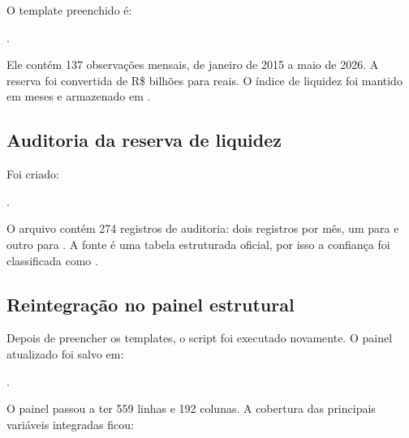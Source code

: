 \documentclass[12pt,a4paper]{article}
\begin{document}
O template preenchido é:
\begin{center}
.
\end{center}

Ele contém 137 observações mensais, de janeiro de 2015 a maio de 2026. A reserva
foi convertida de R\$ bilhões para reais. O índice de liquidez foi mantido em meses
e armazenado em .

\subsection{Auditoria da reserva de liquidez}

Foi criado:
\begin{center}
.
\end{center}

O arquivo contém 274 registros de auditoria: dois registros por mês, um para
 e outro para
. A fonte é uma tabela estruturada
oficial, por isso a confiança foi classificada como .

\subsection{Reintegração no painel estrutural}

Depois de preencher os templates, o script  foi
executado novamente. O painel atualizado foi salvo em:

\begin{center}
.
\end{center}

O painel passou a ter 559 linhas e 192 colunas. A cobertura das principais
variáveis integradas ficou:
\end{document}
